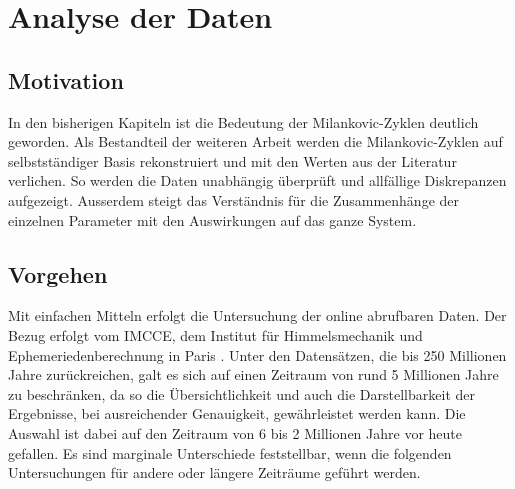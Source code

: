 %
%
%
%
\section{Analyse der Daten 
\label{milankovic:section:WissenschaftlicheArbeit}}

\subsection{Motivation
	\label{milankovic:subsection:Motivation}}
In den bisherigen Kapiteln ist die Bedeutung der Milankovic-Zyklen deutlich geworden. Als Bestandteil der weiteren Arbeit werden die Milankovic-Zyklen auf selbstständiger Basis rekonstruiert und mit den Werten aus der Literatur verlichen. So werden die Daten unabhängig überprüft und allfällige Diskrepanzen aufgezeigt. Ausserdem steigt das Verständnis für die Zusammenhänge der einzelnen Parameter mit den Auswirkungen auf das ganze System. 

\subsection{Vorgehen
\label{milankovic:subsection:Vorgehen}}
Mit einfachen Mitteln erfolgt die Untersuchung der online abrufbaren Daten.
Der Bezug erfolgt vom IMCCE, dem Institut für Himmelsmechanik und Ephemeriedenberechnung in Paris
\cite{milankovic:vo.imcce.fr}.
Unter den Datensätzen, die bis 250 Millionen Jahre zurückreichen, galt es sich auf einen Zeitraum von rund 5 Millionen Jahre zu beschränken, da so die Übersichtlichkeit und auch die Darstellbarkeit der Ergebnisse, bei ausreichender Genauigkeit, gewährleistet werden kann.
Die Auswahl ist dabei auf den Zeitraum von 6 bis 2 Millionen Jahre vor heute gefallen.
Es sind marginale Unterschiede feststellbar, wenn die folgenden Untersuchungen für andere oder längere Zeiträume geführt werden.

